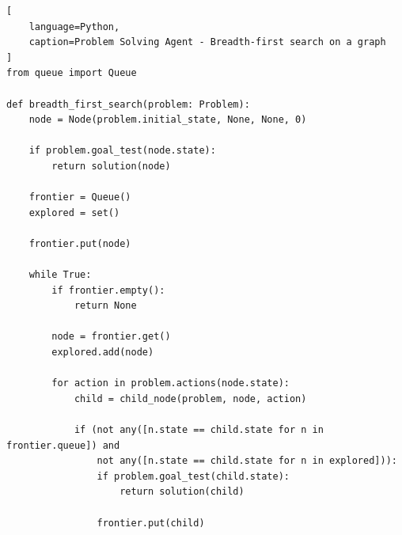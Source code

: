 \begin{lstlisting}[
    language=Python,
    caption=Problem Solving Agent - Breadth-first search on a graph
]
from queue import Queue

def breadth_first_search(problem: Problem):
    node = Node(problem.initial_state, None, None, 0)

    if problem.goal_test(node.state):
        return solution(node)
    
    frontier = Queue()
    explored = set()

    frontier.put(node)

    while True:
        if frontier.empty():
            return None
        
        node = frontier.get()
        explored.add(node)

        for action in problem.actions(node.state):
            child = child_node(problem, node, action)
            
            if (not any([n.state == child.state for n in frontier.queue]) and 
                not any([n.state == child.state for n in explored])):
                if problem.goal_test(child.state):            
                    return solution(child)

                frontier.put(child)
\end{lstlisting}











